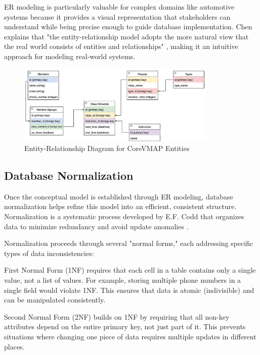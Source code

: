 ER modeling is particularly valuable for complex domains like automotive systems because it provides a visual representation that stakeholders can understand while being precise enough to guide database implementation. Chen explains that "the entity-relationship model adopts the more natural view that the real world consists of entities and relationships" \cite{chen1976entity}, making it an intuitive approach for modeling real-world systems.

\begin{figure}[ht]
    \centering
    \includegraphics[width=0.85\textwidth]{figures/er_diagram.png}
    \caption{Entity-Relationship Diagram for Core\ac{VMAP} Entities \cite{RelationalData}}
    \label{fig:er-diagram}
\end{figure}

\subsection{Database Normalization}
\label{subsec:database-normalization}

Once the conceptual model is established through ER modeling, database normalization helps refine this model into an efficient, consistent structure. Normalization is a systematic process developed by E.F. Codd that organizes data to minimize redundancy and avoid update anomalies \cite{codd1970relational}.

Normalization proceeds through several "normal forms," each addressing specific types of data inconsistencies:

First Normal Form (1NF) requires that each cell in a table contains only a single value, not a list of values. For example, storing multiple phone numbers in a single field would violate 1NF. This ensures that data is atomic (indivisible) and can be manipulated consistently.

Second Normal Form (2NF) builds on 1NF by requiring that all non-key attributes depend on the entire primary key, not just part of it. This prevents situations where changing one piece of data requires multiple updates in different places.


